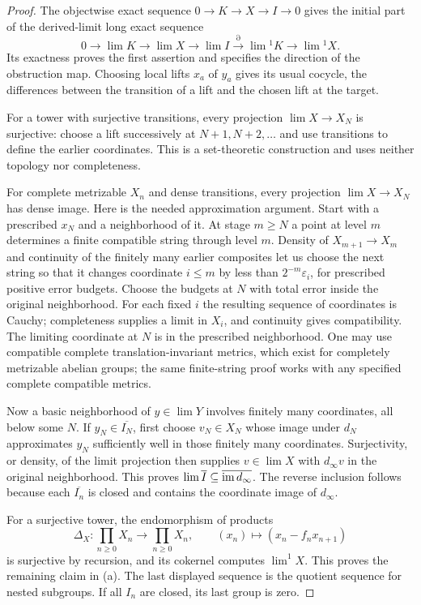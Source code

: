 \begin{proof}
The objectwise exact sequence $0\to K\to X\to I\to0$ gives the initial part of the derived-limit long exact sequence
\[
 0\to\lim K\to\lim X\to\lim I
 \xrightarrow{\partial}\lim{}^1K\to\lim{}^1X.
\]
Its exactness proves the first assertion and specifies the direction of the obstruction map. Choosing local lifts $x_a$ of $y_a$ gives its usual cocycle, the differences between the transition of a lift and the chosen lift at the target.

For a tower with surjective transitions, every projection $\lim X\to X_N$ is surjective: choose a lift successively at $N+1,N+2,\ldots$ and use transitions to define the earlier coordinates. This is a set-theoretic construction and uses neither topology nor completeness.

For complete metrizable $X_n$ and dense transitions, every projection $\lim X\to X_N$ has dense image. Here is the needed approximation argument. Start with a prescribed $x_N$ and a neighborhood of it. At stage $m\geq N$ a point at level $m$ determines a finite compatible string through level $m$. Density of $X_{m+1}\to X_m$ and continuity of the finitely many earlier composites let us choose the next string so that it changes coordinate $i\leq m$ by less than $2^{-m}\varepsilon_i$, for prescribed positive error budgets. Choose the budgets at $N$ with total error inside the original neighborhood. For each fixed $i$ the resulting sequence of coordinates is Cauchy; completeness supplies a limit in $X_i$, and continuity gives compatibility. The limiting coordinate at $N$ is in the prescribed neighborhood. One may use compatible complete translation-invariant metrics, which exist for completely metrizable abelian groups; the same finite-string proof works with any specified complete compatible metrics.

Now a basic neighborhood of $y\in\lim Y$ involves finitely many coordinates, all below some $N$. If $y_N\in\overline{I_N}$, first choose $v_N\in X_N$ whose image under $d_N$ approximates $y_N$ sufficiently well in those finitely many coordinates. Surjectivity, or density, of the limit projection then supplies $v\in\lim X$ with $d_\infty v$ in the original neighborhood. This proves $\lim\overline I\subseteq\overline{\operatorname{im} d_\infty}$. The reverse inclusion follows because each $\overline{I_n}$ is closed and contains the coordinate image of $d_\infty$.

For a surjective tower, the endomorphism of products
\[
 \Delta_X:\prod_{n\geq0}X_n\to\prod_{n\geq0}X_n,
 \qquad (x_n)\mapsto(x_n-f_nx_{n+1})
\]
is surjective by recursion, and its cokernel computes $\lim^1X$. This proves the remaining claim in (a). The last displayed sequence is the quotient sequence for nested subgroups. If all $I_n$ are closed, its last group is zero.


\end{proof}

